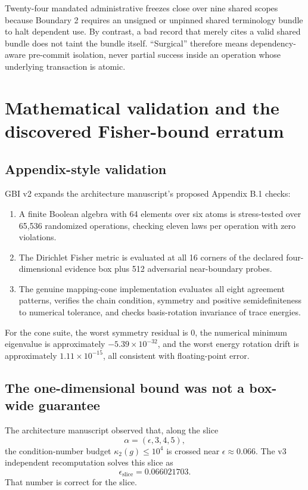 \documentclass[11pt]{article}
\begin{document}
Twenty-four mandated administrative freezes close over nine shared scopes because Boundary 2 requires an unsigned or unpinned shared terminology bundle to halt dependent use. By contrast, a bad record that merely cites a valid shared bundle does not taint the bundle itself. ``Surgical'' therefore means dependency-aware pre-commit isolation, never partial success inside an operation whose underlying transaction is atomic.

\section{Mathematical validation and the discovered Fisher-bound erratum}

\subsection{Appendix-style validation}

GBI v2 expands the architecture manuscript's proposed Appendix B.1 checks:

\begin{enumerate}
  \item A finite Boolean algebra with 64 elements over six atoms is stress-tested over 65,536 randomized operations, checking eleven laws per operation with zero violations.
  \item The Dirichlet Fisher metric is evaluated at all 16 corners of the declared four-dimensional evidence box plus 512 adversarial near-boundary probes.
  \item The genuine mapping-cone implementation evaluates all eight agreement patterns, verifies the chain condition, symmetry and positive semidefiniteness to numerical tolerance, and checks basis-rotation invariance of trace energies.
\end{enumerate}

For the cone suite, the worst symmetry residual is 0, the numerical minimum eigenvalue is approximately \(-5.39\times10^{-32}\), and the worst energy rotation drift is approximately \(1.11\times10^{-15}\), all consistent with floating-point error.

\subsection{The one-dimensional bound was not a box-wide guarantee}
\label{sec:fisher-erratum}

The architecture manuscript observed that, along the slice
\[
\alpha=(\epsilon,3,4,5),
\]
the condition-number budget \(\kappa_2(g)\le10^4\) is crossed near \(\epsilon\approx0.066\). The v3 independent recomputation solves this slice as
\[
\epsilon_{\mathrm{slice}}=0.066021703.
\]
That number is correct for the slice.
\end{document}
